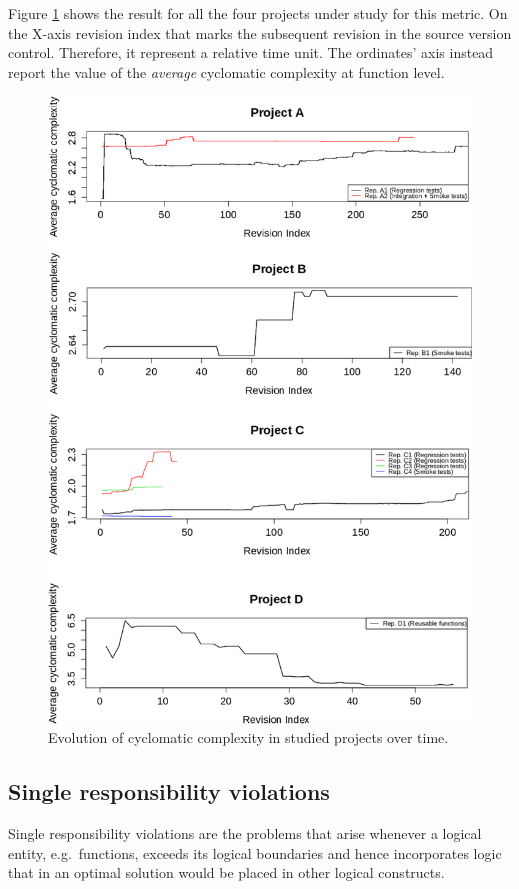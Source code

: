     Figure \ref{fig:avg-complexity-together} shows the result for all the four projects under study for this metric. On the X-axis revision index that marks the subsequent revision in the source version control. Therefore, it represent a relative time unit. The ordinates' axis instead report the value of the \textit{average} cyclomatic complexity at function level.

\begin{figure}[!htbp]
    \centering
    \includegraphics[width=\textwidth,keepaspectratio]{figure/results/rq1/avg-complexity-together.pdf}
    \caption{Evolution of cyclomatic complexity in studied projects over time.}
    \label{fig:avg-complexity-together}
\end{figure}


\subsection{Single responsibility violations}
    Single responsibility violations are the problems that arise whenever a logical entity, e.g.\ functions, exceeds its logical boundaries and hence incorporates logic that in an optimal solution would be placed in other logical constructs.

